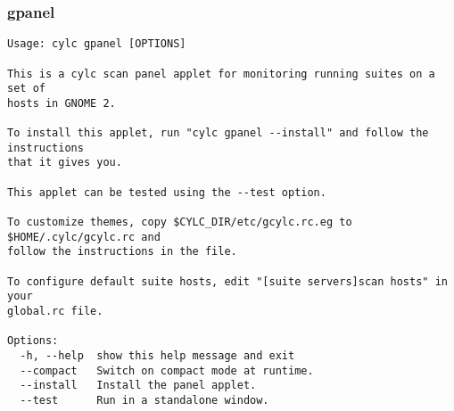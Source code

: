 \subsubsection{gpanel}
\label{gpanel}
\begin{lstlisting}
Usage: cylc gpanel [OPTIONS]

This is a cylc scan panel applet for monitoring running suites on a set of
hosts in GNOME 2.

To install this applet, run "cylc gpanel --install" and follow the instructions
that it gives you.

This applet can be tested using the --test option.

To customize themes, copy $CYLC_DIR/etc/gcylc.rc.eg to $HOME/.cylc/gcylc.rc and
follow the instructions in the file.

To configure default suite hosts, edit "[suite servers]scan hosts" in your
global.rc file.

Options:
  -h, --help  show this help message and exit
  --compact   Switch on compact mode at runtime.
  --install   Install the panel applet.
  --test      Run in a standalone window.
\end{lstlisting}
